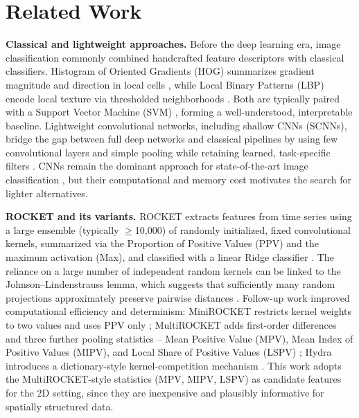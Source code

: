 \documentclass[a4paper,fleqn]{cas-sc}
\begin{document}
\section{Related Work}\label{sec:related}

\textbf{Classical and lightweight approaches.} Before the deep learning era, image classification commonly combined handcrafted feature descriptors with classical classifiers. Histogram of Oriented Gradients (HOG) summarizes gradient magnitude and direction in local cells \citep{dalal2005histograms}, while Local Binary Patterns (LBP) encode local texture via thresholded neighborhoods \citep{pietikainen2011local}. Both are typically paired with a Support Vector Machine (SVM) \citep{cortes1995support}, forming a well-understood, interpretable baseline. Lightweight convolutional networks, including shallow CNNs (SCNNs), bridge the gap between full deep networks and classical pipelines by using few convolutional layers and simple pooling while retaining learned, task-specific filters \citep{lei2019shallow}. CNNs remain the dominant approach for state-of-the-art image classification \citep{krichen2023cnn}, but their computational and memory cost motivates the search for lighter alternatives.

\textbf{ROCKET and its variants.} ROCKET extracts features from time series using a large ensemble (typically $\geq$10{,}000) of randomly initialized, fixed convolutional kernels, summarized via the Proportion of Positive Values (PPV) and the maximum activation (Max), and classified with a linear Ridge classifier \citep{dempster2020rocket}. The reliance on a large number of independent random kernels can be linked to the Johnson--Lindenstrauss lemma, which suggests that sufficiently many random projections approximately preserve pairwise distances \citep{ghojogh2021johnson}. Follow-up work improved computational efficiency and determinism: MiniROCKET restricts kernel weights to two values and uses PPV only \citep{dempster2020minirocket}; MultiROCKET adds first-order differences and three further pooling statistics -- Mean Positive Value (MPV), Mean Index of Positive Values (MIPV), and Local Share of Positive Values (LSPV) \citep{tan2022multirocket}; Hydra introduces a dictionary-style kernel-competition mechanism \citep{dempster2022hydra}. This work adopts the MultiROCKET-style statistics (MPV, MIPV, LSPV) as candidate features for the 2D setting, since they are inexpensive and plausibly informative for spatially structured data.
\end{document}

